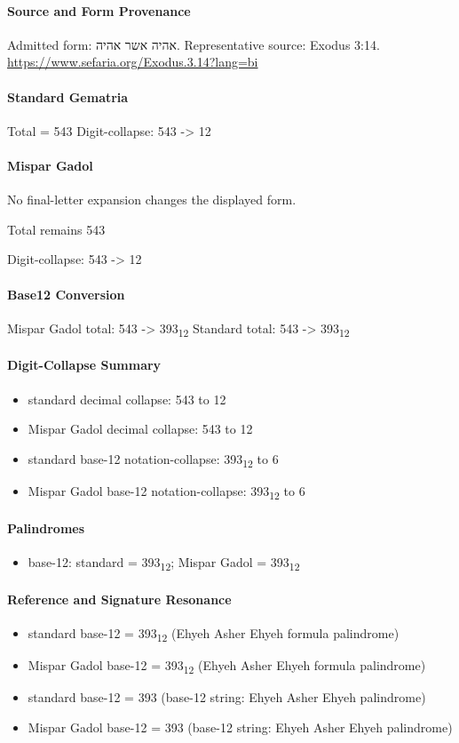 \paragraph{Source and Form Provenance}
Admitted form: אהיה אשר אהיה.
Representative source: Exodus 3:14.
\url{https://www.sefaria.org/Exodus.3.14?lang=bi}
\paragraph{Standard Gematria}
Total = 543
Digit-collapse: 543 -> 12
\paragraph{Mispar Gadol}
No final-letter expansion changes the displayed form.

Total remains 543

Digit-collapse: 543 -> 12
\paragraph{Base12 Conversion}
Mispar Gadol total: 543 -> 393\textsubscript{12}
Standard total: 543 -> 393\textsubscript{12}
\paragraph{Digit-Collapse Summary}
\begin{itemize}
\item standard decimal collapse: 543 to 12
\item Mispar Gadol decimal collapse: 543 to 12
\item standard base-12 notation-collapse: 393\textsubscript{12} to 6
\item Mispar Gadol base-12 notation-collapse: 393\textsubscript{12} to 6
\end{itemize}
\paragraph{Palindromes}
\begin{itemize}
\item base-12: standard = 393\textsubscript{12}; Mispar Gadol = 393\textsubscript{12}
\end{itemize}
\paragraph{Reference and Signature Resonance}
\begin{itemize}
\item standard base-12 = 393\textsubscript{12} (Ehyeh Asher Ehyeh formula palindrome)
\item Mispar Gadol base-12 = 393\textsubscript{12} (Ehyeh Asher Ehyeh formula palindrome)
\item standard base-12 = 393 (base-12 string: Ehyeh Asher Ehyeh palindrome)
\item Mispar Gadol base-12 = 393 (base-12 string: Ehyeh Asher Ehyeh palindrome)
\end{itemize}
